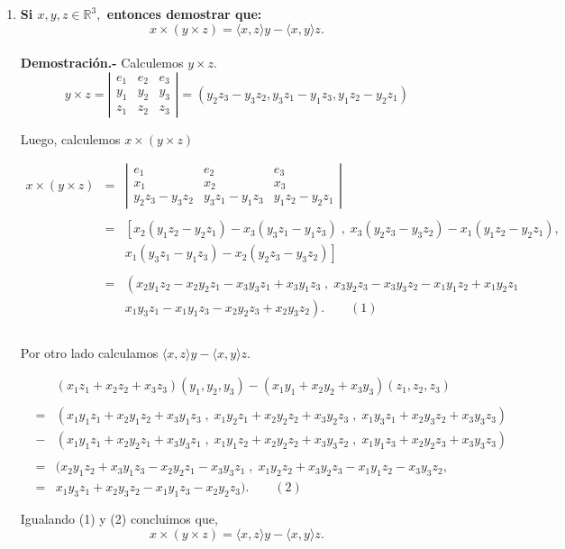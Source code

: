 \begin{enumerate}
    \item \textbf{\boldmath Si $x,y,z \in \mathbb{R}^3,$ entonces demostrar que:
	$$x\times (y \times z) = \langle x,z\rangle y - \langle x,y\rangle z.$$\\
	Demostración.-}\; Calculemos $y\times z$.
	$$y\times z = \left|\begin{array}{ccc}
	    e_1 & e_2 & e_3 \\
	    y_1 & y_2 & y_3 \\
	    z_1 & z_2 & z_3
	\end{array}\right| = \left(y_2z_3-y_3z_2,y_3z_1-y_1z_3, y_1z_2-y_2z_1\right)$$

	Luego, calculemos $x\times (y \times z)$

	$$\begin{array}{rcl}
	    x\times (y\times z) &=& \left|\begin{array}{ccc}
	    e_1 & e_2 & e_3 \\
	    x_1 & x_2 & x_3 \\
	    y_2z_3-y_3z_2 & y_3z_1-y_1z_3 & y_1z_2-y_2z_1
	\end{array}\right|\\\\
	&=& \left[x_2\left(y_1z_2-y_2z_1\right)-x_3\left(y_3z_1-y_1z_3\right)\; , \; x_3\left(y_2z_3-y_3z_2\right)-x_1\left(y_1z_2-y_2z_1\right),\right.\\
	&&\left.x_1\left(y_3z_1-y_1z_3\right)-x_2\left(y_2z_3-y_3z_2\right)\right]\\\\
	&=& \left(x_2y_1z_2-x_2y_2z_1-x_3y_3z_1+x_3y_1z_3\; , \; x_3y_2z_3-x_3y_3z_2-x_1y_1z_2+x_1y_2z_1\right.\\
	&&\left.x_1y_3z_1-x_1y_1z_3-x_2y_2z_3+x_2y_3z_2\right).\qquad (1)\\\\
	\end{array}$$

	Por otro lado calculamos $\langle x,z\rangle y - \langle x,y\rangle z$.

	$$\begin{array}{rcl}
	    &&(x_1z_1+x_2z_2+x_3z_3)(y_1,y_2,y_3)-(x_1y_1+x_2y_2+x_3y_3)(z_1,z_2,z_3)\\\\
	    &=& (x_1y_1z_1+x_2y_1z_2+x_3y_1z_3\; ,\; x_1y_2z_1+x_2y_2z_2+x_3y_2z_3\; , \; x_1y_3z_1+x_2y_3z_2+x_3y_3z_3)\\
	    &-&(x_1y_1z_1+x_2y_2z_1+x_3y_3z_1\; , \; x_1y_1z_2+x_2y_2z_2+x_3y_3z_2\; ,\; x_1y_1z_3+x_2y_2z_3+x_3y_3z_3)\\\\
	    &=&(x_2y_1z_2+x_3y_1z_3-x_2y_2z_1-x_3y_3z_1\; , \; x_1y_2z_2+x_3y_2z_3-x_1y_1z_2-x_3y_3z_2 ,\\
	    &=& x_1y_3z_1+x_2y_3z_2-x_1y_1z_3-x_2y_2z_3). \qquad (2)\\\\
	\end{array}$$
	Igualando (1) y (2) concluimos que,
	$$x\times (y \times z) = \langle x,z\rangle y - \langle x,y\rangle z.$$\\


\end{enumerate}
